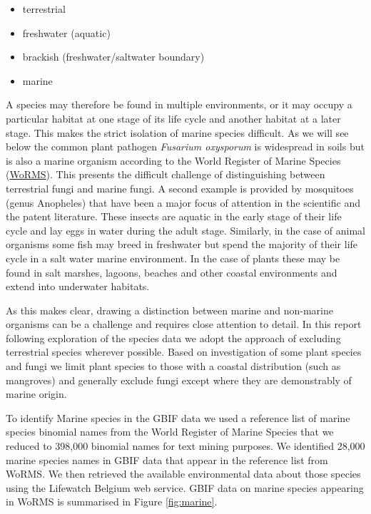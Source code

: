\documentclass[openany]{book}
\providecommand{\tightlist}{%
  \setlength{\itemsep}{0pt}\setlength{\parskip}{0pt}}
\theoremstyle{definition}
\theoremstyle{definition}
\theoremstyle{definition}
\theoremstyle{remark}
\begin{document}
\begin{itemize}
\tightlist
\item
  terrestrial
\item
  freshwater (aquatic)
\item
  brackish (freshwater/saltwater boundary)
\item
  marine
\end{itemize}

A species may therefore be found in multiple environments, or it may
occupy a particular habitat at one stage of its life cycle and another
habitat at a later stage. This makes the strict isolation of marine
species difficult. As we will see below the common plant pathogen
\emph{Fusarium oxysporum} is widespread in soils but is also a marine
organism according to the World Register of Marine Species
(\href{http://www.marinespecies.org/aphia.php?p=taxdetails\&id=100523}{WoRMS}).
This presents the difficult challenge of distinguishing between
terrestrial fungi and marine fungi. A second example is provided by
mosquitoes (genus Anopheles) that have been a major focus of attention
in the scientific and the patent literature. These insects are aquatic
in the early stage of their life cycle and lay eggs in water during the
adult stage. Similarly, in the case of animal organisms some fish may
breed in freshwater but spend the majority of their life cycle in a salt
water marine environment. In the case of plants these may be found in
salt marshes, lagoons, beaches and other coastal environments and extend
into underwater habitats.

As this makes clear, drawing a distinction between marine and non-marine
organisms can be a challenge and requires close attention to detail. In
this report following exploration of the species data we adopt the
approach of excluding terrestrial species wherever possible. Based on
investigation of some plant species and fungi we limit plant species to
those with a coastal distribution (such as mangroves) and generally
exclude fungi except where they are demonstrably of marine origin.

To identify Marine species in the GBIF data we used a reference list of
marine species binomial names from the World Register of Marine Species
that we reduced to 398,000 binomial names for text mining purposes. We
identified 28,000 marine species names in GBIF data that appear in the
reference list from WoRMS. We then retrieved the available environmental
data about those species using the Lifewatch Belgium web service. GBIF
data on marine species appearing in WoRMS is summarised in Figure
\ref{fig:marine}.
\end{document}

